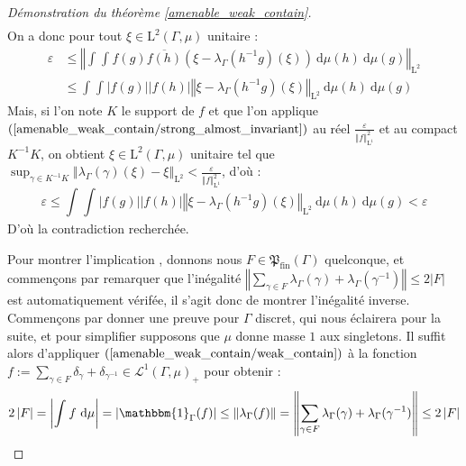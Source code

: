 \documentclass[a4paper,12pt]{article}
\newcommand{\norm}[1]{\left\Vert #1\right\Vert}
\newcommand{\abs}[1]{\left\vert#1\right\vert}
\newcommand{\card}[1]{\abs{#1}}
\newcommand{\indic}{\mathbbm{1}}
\newcommand{\integral}[4]{\int_{#1}^{#2} #3~\mathrm{d}#4}
\newcommand{\inv}{^{-1}}
\renewcommand{\implies}{\Rightarrow}
\newcommand{\finparts}{\mathfrak{P}_{\mathrm{fin}}}
\begin{document}
\begin{proof}[Démonstration du théorème \ref{amenable_weak_contain}]
\begin{align*}
    \end{align*}
    On a donc pour tout $\xi\in\mathrm{L}^2(\Gamma, \mu)$ unitaire :
    \begin{align*}
        \varepsilon 
            &\le \norm{\integral{}{}{\integral{}{}{f(g)\overline{f(h)}(\xi - \lambda_\Gamma(h\inv g)(\xi))}{\mu(h)}}{\mu(g)}}_{\mathrm{L}^2} \\
            &\le \integral{}{}{\integral{}{}{\abs{f(g)}\abs{f(h)}\norm{\xi - \lambda_\Gamma(h\inv g)(\xi)}_{\mathrm{L}^2}}{\mu(h)}}{\mu(g)}
    \end{align*}
    Mais, si l'on note $K$ le support de $f$ et que l'on applique $(\ref{amenable_weak_contain/strong_almost_invariant})$ au réel $\frac{\varepsilon}{\norm{f}_{\mathrm{L}^1}^2}$ et au compact $K\inv K$,
    on obtient $\xi\in\mathrm{L}^2(\Gamma, \mu)$ unitaire tel que $\sup_{\gamma\in K\inv K} \norm{\lambda_\Gamma(\gamma)(\xi) - \xi}_{\mathrm{L}^2}<\frac{\varepsilon}{\norm{f}_{\mathrm{L}^1}^2}$, d'où :
    \begin{equation*}
        \varepsilon
            \le \integral{}{}{\integral{}{}{\abs{f(g)}\abs{f(h)}\norm{\xi - \lambda_\Gamma(h\inv g)(\xi)}_{\mathrm{L}^2}}{\mu(h)}}{\mu(g)} 
            < \varepsilon
    \end{equation*}
    D'où la contradiction recherchée.

    Pour montrer l'implication \framebox{$(\ref{amenable_weak_contain/weak_contain})\implies(\ref{amenable_weak_contain/norm_eq_two})$}, donnons nous 
    $F\in\finparts(\Gamma)$ quelconque, et commençons par remarquer 
    que l'inégalité $\norm{\sum_{\gamma\in F}\lambda_\Gamma(\gamma)+\lambda_\Gamma(\gamma\inv)} \le 2\card{F}$ est automatiquement vérifée, il s'agit donc de montrer l'inégalité 
    inverse. Commençons par donner une preuve pour $\Gamma$ discret, qui nous éclairera pour la suite, et pour simplifier supposons
    que $\mu$ donne masse $1$ aux singletons. Il suffit alors d'appliquer $(\ref{amenable_weak_contain/weak_contain})$
    à la fonction $f := \sum_{\gamma\in F}\delta_\gamma + \delta_{\gamma\inv}\in\mathscr{L}^1(\Gamma, \mu)_{+}$ pour obtenir :
    \begin{equation*}
        2\card{F} = \abs{\integral{}{}{f}{\mu}} = \abs{\indic_\Gamma(f)} \le \norm{\lambda_\Gamma(f)} = \norm{\sum_{\gamma\in F}\lambda_\Gamma(\gamma)+\lambda_\Gamma(\gamma\inv)}\le2\card{F}
    \end{equation*}


\end{proof}
\end{document}
